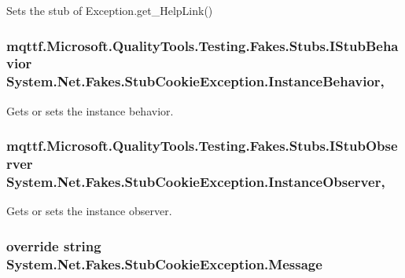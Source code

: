 Sets the stub of Exception.\-get\-\_\-\-Help\-Link()

\hypertarget{class_system_1_1_net_1_1_fakes_1_1_stub_cookie_exception_acc2360a0684e21e02b0fcccf6b413f3e}{
\subsubsection[{Instance\-Behavior}]{\setlength{\rightskip}{0pt plus 5cm}mqttf.\-Microsoft.\-Quality\-Tools.\-Testing.\-Fakes.\-Stubs.\-I\-Stub\-Behavior System.\-Net.\-Fakes.\-Stub\-Cookie\-Exception.\-Instance\-Behavior\hspace{0.3cm}{\ttfamily [get]}, {\ttfamily [set]}}}\label{class_system_1_1_net_1_1_fakes_1_1_stub_cookie_exception_acc2360a0684e21e02b0fcccf6b413f3e}


Gets or sets the instance behavior.

\hypertarget{class_system_1_1_net_1_1_fakes_1_1_stub_cookie_exception_a24346306d430ebce8eea040dfb028ce2}{
\subsubsection[{Instance\-Observer}]{\setlength{\rightskip}{0pt plus 5cm}mqttf.\-Microsoft.\-Quality\-Tools.\-Testing.\-Fakes.\-Stubs.\-I\-Stub\-Observer System.\-Net.\-Fakes.\-Stub\-Cookie\-Exception.\-Instance\-Observer\hspace{0.3cm}{\ttfamily [get]}, {\ttfamily [set]}}}\label{class_system_1_1_net_1_1_fakes_1_1_stub_cookie_exception_a24346306d430ebce8eea040dfb028ce2}


Gets or sets the instance observer.

\hypertarget{class_system_1_1_net_1_1_fakes_1_1_stub_cookie_exception_a1fd6f26b4e3b1fd35bacccd477f3ca68}{
\subsubsection[{Message}]{\setlength{\rightskip}{0pt plus 5cm}override string System.\-Net.\-Fakes.\-Stub\-Cookie\-Exception.\-Message\hspace{0.3cm}{\ttfamily [get]}}}\label{class_system_1_1_net_1_1_fakes_1_1_stub_cookie_exception_a1fd6f26b4e3b1fd35bacccd477f3ca68}


